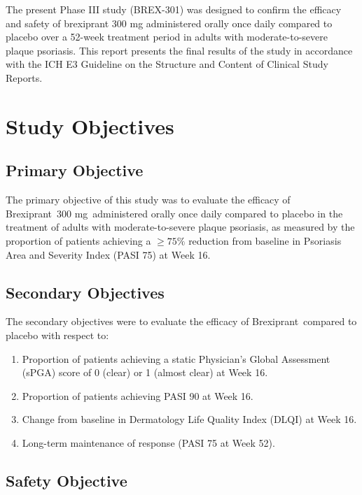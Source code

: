 \documentclass[11pt, a4paper]{article}
\newcommand{\studydrug}{Brexiprant}
\newcommand{\studydose}{300 mg}
\begin{document}
\vspace{4pt}
The present Phase III study (BREX-301) was designed to confirm the efficacy and safety of brexiprant 300 mg administered orally once daily compared to placebo over a 52-week treatment period in adults with moderate-to-severe plaque psoriasis. This report presents the final results of the study in accordance with the ICH E3 Guideline on the Structure and Content of Clinical Study Reports.

\newpage

\section{Study Objectives}

\subsection{Primary Objective}

The primary objective of this study was to evaluate the efficacy of \studydrug\ \studydose\ administered orally once daily compared to placebo in the treatment of adults with moderate-to-severe plaque psoriasis, as measured by the proportion of patients achieving a $\ge 75\%$ reduction from baseline in Psoriasis Area and Severity Index (PASI 75) at Week 16.

\subsection{Secondary Objectives}

The secondary objectives were to evaluate the efficacy of \studydrug\ compared to placebo with respect to:

\begin{enumerate}[label=\arabic*.]
  \item Proportion of patients achieving a static Physician's Global Assessment (sPGA) score of 0 (clear) or 1 (almost clear) at Week 16.
  \item Proportion of patients achieving PASI 90 at Week 16.
  \item Change from baseline in Dermatology Life Quality Index (DLQI) at Week 16.
  \item Long-term maintenance of response (PASI 75 at Week 52).
\end{enumerate}

\subsection{Safety Objective}
\end{document}
